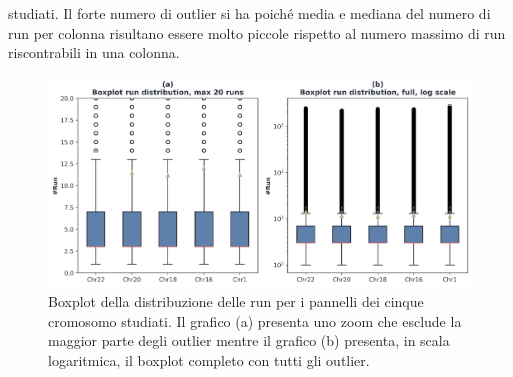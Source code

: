 studiati. Il forte numero di outlier si ha poiché media e 
mediana del numero di run per colonna risultano essere molto piccole rispetto al
numero massimo di run riscontrabili in una colonna.
\begin{figure}
  \centering
  \includegraphics[width = \linewidth]{img/boxplotbi.png}
  \vspace{-5mm}
  \caption{Boxplot della distribuzione delle run per i pannelli dei cinque
    cromosomo studiati. Il grafico (a) presenta uno zoom che esclude la maggior
    parte degli outlier mentre il grafico (b) presenta, in scala logaritmica, il
    boxplot completo con tutti gli outlier.}
  \label{fig:boxplot}
\end{figure}
